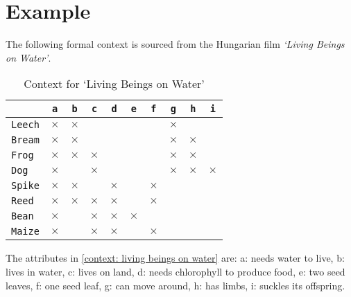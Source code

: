 \section{Example}
\label{section: example}

\begin{example}
    The following formal context is sourced from the Hungarian film \textit{`Living Beings on Water'}.
    \small{
        \begin{table}[htbp]
            \centering
            \begin{tabular}{l|c|c|c|c|c|c|c|c|c}
                               & \texttt{a} & \texttt{b} & \texttt{c} & \texttt{d} & \texttt{e} & \texttt{f} & \texttt{g} & \texttt{h} & \texttt{i} \\
                \hline
                \texttt{Leech} & $\times$   & $\times$   &            &            &            &            & $\times$   &            &            \\
                \hline
                \texttt{Bream} & $\times$   & $\times$   &            &            &            &            & $\times$   & $\times$   &            \\
                \hline
                \texttt{Frog}  & $\times$   & $\times$   & $\times$   &            &            &            & $\times$   & $\times$   &            \\
                \hline
                \texttt{Dog}   & $\times$   &            & $\times$   &            &            &            & $\times$   & $\times$   & $\times$   \\
                \hline
                \texttt{Spike} & $\times$   & $\times$   &            & $\times$   &            & $\times$   &            &            &            \\
                \hline
                \texttt{Reed}  & $\times$   & $\times$   & $\times$   & $\times$   &            & $\times$   &            &            &            \\
                \hline
                \texttt{Bean}  & $\times$   &            & $\times$   & $\times$   & $\times$   &            &            &            &            \\
                \hline
                \texttt{Maize} & $\times$   &            & $\times$   & $\times$   &            & $\times$   &            &            &            \\
            \end{tabular}
            \caption{Context for `Living Beings on Water'}
            \label{context: living beings on water}
        \end{table}
    }
    The attributes in \autoref{context: living beings on water} are: a: needs water to live, b: lives in water, c: lives on land, d: needs chlorophyll to produce food, e: two seed leaves, f: one seed leaf, g: can move around, h: has limbs, i: suckles its offspring.

\end{example}
